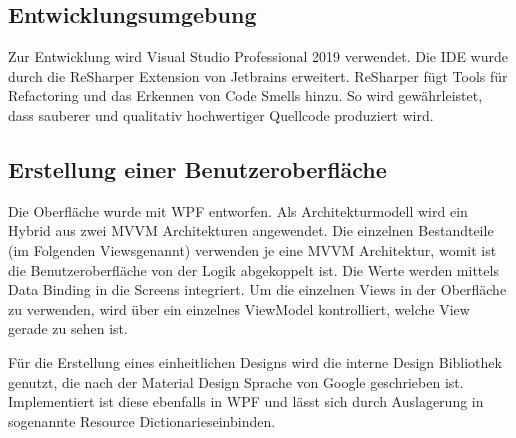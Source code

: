 \subsection{Entwicklungsumgebung}
\label{sec:Entwicklungsumgebung}
Zur Entwicklung wird Visual Studio Professional 2019 verwendet. Die IDE wurde durch die ReSharper Extension von Jetbrains erweitert. ReSharper fügt Tools für Refactoring und das Erkennen von Code Smells hinzu. So wird gewährleistet, dass sauberer und qualitativ hochwertiger Quellcode produziert wird.

\subsection{Erstellung einer Benutzeroberfläche}
\label{sec:ErstellungEinerBenutzeroberfläche}
Die Oberfläche wurde mit {\acs{WPF}} entworfen. Als Architekturmodell wird ein Hybrid aus zwei {\acs{MVVM}} Architekturen angewendet. Die einzelnen Bestandteile (im Folgenden \glqq Views\grqq \space genannt) verwenden je eine {\acs{MVVM}} Architektur, womit ist die Benutzeroberfläche von der Logik abgekoppelt ist. Die Werte werden mittels Data Binding in die Screens integriert. Um die einzelnen Views in der Oberfläche zu verwenden, wird über ein einzelnes ViewModel kontrolliert, welche View gerade zu sehen ist.

Für die Erstellung eines einheitlichen Designs wird die {\betriebNameKzf} interne Design Bibliothek genutzt, die nach der Material Design Sprache von Google geschrieben ist. Implementiert ist diese ebenfalls in {\acs{WPF}} und lässt sich durch Auslagerung in sogenannte \glqq Resource Dictionaries\grqq \space einbinden.
